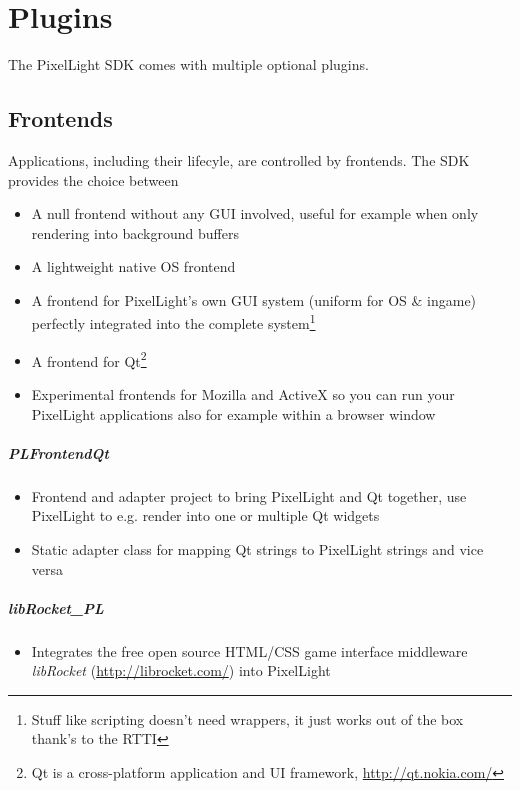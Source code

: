 \chapter{Plugins}
The PixelLight \ac{SDK} comes with multiple optional plugins.




\section{Frontends}
Applications, including their lifecyle, are controlled by frontends. The \ac{SDK} provides the choice between
\begin{itemize}
\item{A null frontend without any \ac{GUI} involved, useful for example when only rendering into background buffers}
\item{A lightweight native \ac{OS} frontend}
\item{A frontend for PixelLight's own \ac{GUI} system (uniform for \ac{OS} \& ingame) perfectly integrated into the complete system\footnote{Stuff like scripting doesn't need wrappers, it just works out of the box thank's to the \ac{RTTI}}}
\item{A frontend for Qt\footnote{Qt is a cross-platform application and \ac{UI} framework, \url{http://qt.nokia.com/}}}
\item{Experimental frontends for Mozilla and ActiveX so you can run your PixelLight applications also for example within a browser window}
\end{itemize}


\paragraph{PLFrontendQt}
\begin{itemize}
\item{Frontend and adapter project to bring PixelLight and Qt together, use PixelLight to e.g. render into one or multiple Qt widgets}
\item{Static adapter class for mapping Qt strings to PixelLight strings and vice versa}
\end{itemize}


\paragraph{libRocket\_PL}
\begin{itemize}
\item{Integrates the free open source \ac{HTML}/\ac{CSS} game interface middleware \emph{libRocket} (\url{http://librocket.com/}) into PixelLight}
\end{itemize}


